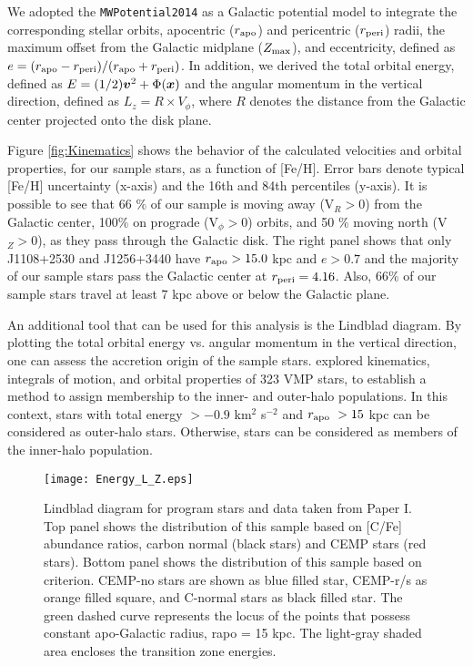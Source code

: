 We adopted the \texttt{MWPotential2014} as a Galactic potential model
\citep[see][for more information]{2015ApJS..216...29B} to integrate the
corresponding stellar orbits, apocentric ($r_\mathrm{apo}$) and pericentric ($r_\mathrm{peri}$)
radii, the maximum offset from the Galactic midplane ($Z_\mathrm{max}$), and
eccentricity, defined as $e = (r_\mathrm{apo} - r_\mathrm{peri}) / (r_\mathrm{apo} + r_\mathrm{peri})$. In addition,
we derived the total orbital energy, defined as $E = (1/2) \mbox{\boldmath $v$}^2 +
\Phi(\mbox{\boldmath $x$})$ and the angular momentum in the vertical direction, defined as
$L_z = R \times V_{\phi}$, where $R$ denotes the distance from the Galactic
center projected onto the disk plane.


Figure \ref{fig:Kinematics} shows the behavior of the calculated velocities and
orbital properties, for our sample stars, as a function of [Fe/H]. Error
bars denote typical [Fe/H] uncertainty (x-axis) and the 16th and 84th
percentiles (y-axis). It is possible to see that 66 $\%$ of our sample is moving
away (V$_{R} >0$) from the Galactic center, 100$\%$ on prograde (V$_{\phi} >0$)
orbits, and 50 $\%$ moving north (V$_{Z} >0$), as they pass through the Galactic
disk. The right panel shows that only J1108+2530 and J1256+3440 have $r_\mathrm{apo} >
15.0$ kpc and $e > 0.7$ and the majority of our sample stars pass the Galactic
center at $r_\mathrm{peri}=4.16$. Also, 66$\%$ of our sample stars travel at least 7 kpc
above or below the Galactic plane. 

An additional tool that can be used for this analysis is the Lindblad diagram.
By plotting the total orbital energy vs. angular momentum in the vertical
direction, one can assess the accretion origin of the sample stars. \citet{2014ApJ...788..180C} explored
kinematics, integrals of motion, and orbital properties of 323 VMP stars, to
establish a method to assign membership to the inner- and outer-halo
populations. In this context, stars with total energy $> -0.9$ km$^{2}$ s$^{-2}$
and $r_\mathrm{apo}~>15$ kpc can be considered as outer-halo stars. Otherwise, stars can
be considered as members of the inner-halo population.
  

\begin{figure}[!ht]
\centering
\texttt{[image: Energy\_L\_Z.eps]} 
\caption{Lindblad diagram for program stars and data taken from Paper I. Top
panel shows the distribution of this sample based on [C/Fe] abundance
ratios, carbon normal (black stars) and CEMP stars (red stars). Bottom panel
shows the distribution of this sample based on \citet{2014ApJ...788..180C}
criterion. CEMP-no stars are shown as blue filled star, CEMP-r/s as orange
filled square, and C-normal stars as black filled star. The green dashed curve
represents the locus of the points that possess constant apo-Galactic radius,
rapo = 15 kpc. The light-gray shaded area encloses the transition zone
energies.}
\label{fig:Lindblad}
\end{figure}

